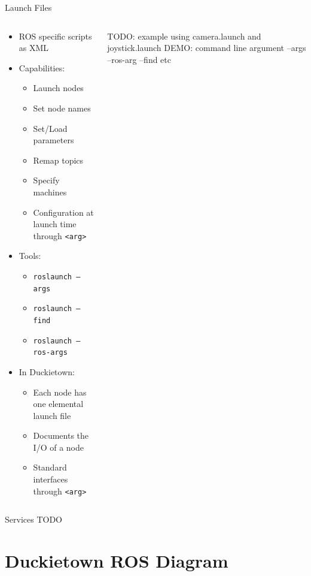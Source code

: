 \documentclass{beamer}
\newcommand{\bashinline}[1]{\texttt{#1}}
\begin{document}
\begin{frame}{Launch Files}
	\begin{columns}
		\begin{column}{0.6\textwidth}
			\begin{itemize}
				\item ROS specific scripts as XML
				\item Capabilities:
					\begin{itemize}
						\item Launch nodes
						\item Set node names
						\item Set/Load parameters
						\item Remap topics
						\item Specify machines
						\item Configuration at launch time through \bashinline{<arg>}
					\end{itemize}
				\item Tools:
					\begin{itemize}
						\item \bashinline{roslaunch --args}
						\item \bashinline{roslaunch --find}
						\item \bashinline{roslaunch --ros-args}
					\end{itemize}
				\item In Duckietown:
					\begin{itemize}
						\item Each node has one elemental launch file
						\item Documents the I/O of a node
						\item Standard interfaces through \bashinline{<arg>}
					\end{itemize}
			\end{itemize}
		\end{column}
	\begin{column}{0.4\textwidth}
		\centering
		TODO: example using camera.launch and joystick.launch
		DEMO: command line argument --args --ros-arg --find etc
		\end{column}
	\end{columns}
\end{frame}

\begin{frame}{Services}
	TODO
\end{frame}

\section{Duckietown ROS Diagram}
\end{document}
